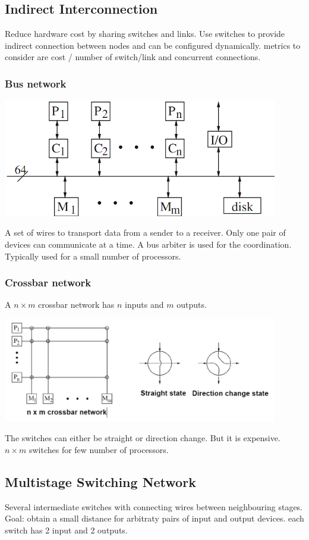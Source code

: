 \documentclass{article}
\begin{document}
\subsection{Indirect Interconnection}
Reduce hardware cost by sharing switches and links.
Use switches to provide indirect connection between nodes and can be configured dynamically.
metrics to consider are cost / number of switch/link and concurrent connections.

\subsubsection{Bus network}
\includegraphics[width=0.9\textwidth]{l10_bus_network.png}

A set of wires to transport data from a sender to a receiver.
Only one pair of devices can communicate at a time.
A bus arbiter is used for the coordination.
Typically used for a small number of processors.

\subsubsection{Crossbar network}
A $n \times m$ crossbar network has $n$ inputs and $m$ outputs.

\includegraphics[width=0.9\textwidth]{l10_crossbar_network.png}

The switches can either be straight or direction change.
But it is expensive. $n \times m$ switches for few number of processors.

\subsection{Multistage Switching Network}
Several intermediate switches with connecting wires between neighbouring stages.
Goal: obtain a small distance for arbitraty pairs of input and output devices.
each switch has 2 input and 2 outputs.
\end{document}
